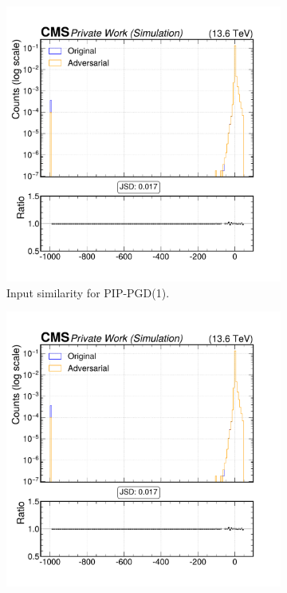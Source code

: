 \begin{figure}[h]
  \centering
  \begin{subfigure}[t]{0.32\textwidth}
    \includegraphics[width=\linewidth]{media/output/features/compare/combined_it_1/cmp_global_features_TagVarCSV_trackSip2dSigAboveCharm.pdf}
    \caption*{Input similarity for PIP-PGD(1).}
  \end{subfigure}\hfill
  \begin{subfigure}[t]{0.32\textwidth}
    \includegraphics[width=\linewidth]{media/output/features/compare/combined_it_2/cmp_global_features_TagVarCSV_trackSip2dSigAboveCharm.pdf}

\end{subfigure}
\end{figure}
